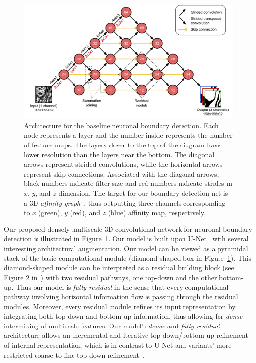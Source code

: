 \documentclass{article}
\begin{document}
\begin{figure}[!b]
\centering
\includegraphics[width=1.0\linewidth]{baseline.pdf}

\caption{Architecture for the baseline neuronal boundary detection. Each node
represents a layer and the number inside represents the number of feature maps.
The layers closer to the top of the diagram have lower resolution than the
layers near the bottom. The diagonal arrows represent strided convolutions,
while the horizontal arrows represent skip connections. Associated with the
diagonal arrows, black numbers indicate filter size and red numbers indicate
strides in $x$, $y$, and $z$-dimension. The target for our boundary detection
net is a 3D \emph{affinity graph}~\cite{boundary_detection,kisuk,funke2017deep},
thus outputting three channels corresponding to $x$ (green), $y$ (red), and $z$
(blue) affinity map, respectively.}

\label{fig:boundary_detector}
\end{figure}

Our proposed densely multiscale 3D convolutional network for neuronal boundary
detection is illustrated in Figure~\ref{fig:boundary_detector}. Our model is
built upon U-Net~\cite{unet} with several interesting architectural
augmentation. Our model can be viewed as a pyramidal stack of the basic
computational module (diamond-shaped box in Figure~\ref{fig:boundary_detector}).
This diamond-shaped module can be interpreted as a residual building block (see
Figure 2 in~\cite{resnet}) with two residual pathways, one top-down and the
other bottom-up. Thus our model is \emph{fully residual} in the sense that every
computational pathway involving horizontal information flow is passing through
the residual modules. Moreover, every residual module refines its input
representation by integrating both top-down and bottom-up information, thus
allowing for \emph{dense} intermixing of multiscale features. Our model's
\emph{dense} and \emph{fully residual} architecture allows an incremental and
iterative top-down/bottom-up refinement of internal representation, which is in
contrast to U-Net and variants' more restricted coarse-to-fine top-down
refinement~\cite{pinheiro2016refine,lin2016pyramid}.
\end{document}

